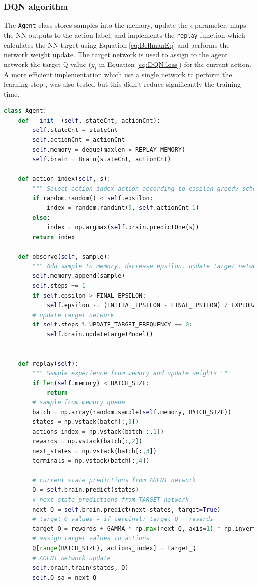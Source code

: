 \documentclass[a4paper, 11pt]{article}
\begin{document}
\subsubsection{DQN algorithm}
The \texttt{Agent} class stores samples into the memory, update the $\epsilon$ parameter, maps the NN outputs to the action label, and implements the \texttt{replay} function which calculates the NN target using Equation \ref{eq:BellmanEq} and performs the network weight update. The target network is used to assign to the agent network the target Q-value ($y_i$ in Equation \ref{eq:DQN-loss}) for the current action. A more efficient implementation which use a single network to perform the learning step \cite{Ecoffet}, was also tested but this didn't reduce significantly the training time.
\begin{lstlisting}[language=Python, caption=DQN Agent definition, label={lst:DQN-agent}]
class Agent:
    def __init__(self, stateCnt, actionCnt):
        self.stateCnt = stateCnt
        self.actionCnt = actionCnt
        self.memory = deque(maxlen = REPLAY_MEMORY) 
        self.brain = Brain(stateCnt, actionCnt)
        
    def action_index(self, s):
        """ Select action index action according to epsilon-greedy scheme """
        if random.random() < self.epsilon:
            index = random.randint(0, self.actionCnt-1)
        else:
            index = np.argmax(self.brain.predictOne(s))
        return index
  
    def observe(self, sample):
        """ Add sample to memory, decrease epsilon, update target network"""
        self.memory.append(sample)
        self.steps += 1
        if self.epsilon > FINAL_EPSILON:
            self.epsilon -= (INITIAL_EPSILON - FINAL_EPSILON) / EXPLORATION
        # update target network 
        if self.steps % UPDATE_TARGET_FREQUENCY == 0:
            self.brain.updateTargetModel()
    
    
    def replay(self):
        """ Sample experience from memory and update weights """
        if len(self.memory) < BATCH_SIZE: 
            return        
        # sample from memory queue
        batch = np.array(random.sample(self.memory, BATCH_SIZE))    
        states = np.vstack(batch[:,0])
        actions_index = np.vstack(batch[:,1])
        rewards = np.vstack(batch[:,2])
        next_states = np.vstack(batch[:,3])
        terminals = np.vstack(batch[:,4])
        
        # current state predictions from AGENT network
        Q = self.brain.predict(states)
        # next_state predictions from TARGET network
        next_Q = self.brain.predict(next_states, target=True)
        # target Q values - if terminal: target_Q = rewards
        target_Q = rewards + GAMMA * np.max(next_Q, axis=1) * np.invert(terminals)
        # assign target values to actions
        Q[range(BATCH_SIZE), actions_index] = target_Q 
        # AGENT network update
        self.brain.train(states, Q)
        self.Q_sa = next_Q
\end{lstlisting}
\end{document}
